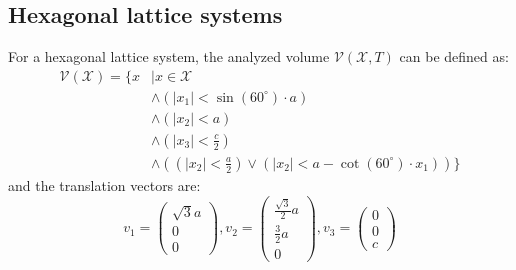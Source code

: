   \subsection{Hexagonal lattice systems}
  For a hexagonal lattice system, the analyzed volume $\mathcal{V}(\mathcal{X},T)$ can be defined as: 
  \begin{align*}\mathcal{V}(\mathcal{X}) = \{x &| x \in \mathcal{X} \\ &\land (|x_1| < \sin(60^\circ)\cdot a)\\ &\land (|x_2| < a) \\ &\land (|x_3| < \frac{c}{2}) \\ &\land ((|x_2| < \frac{a}{2}) \lor (|x_2| < a - \cot(60^\circ) \cdot x_1))\}\end{align*}
  and the translation vectors are:
  \begingroup
  \renewcommand*{\arraystretch}{1.2}
  \[
  v_1 = \begin{pmatrix}\sqrt{3}a\\0\\0\end{pmatrix},
  v_2 = \begin{pmatrix}\frac{\sqrt{3}}{2}a\\\frac{3}{2}a\\0\end{pmatrix},
  v_3 = \begin{pmatrix}0\\0\\c\end{pmatrix}
  \]
  \endgroup  
